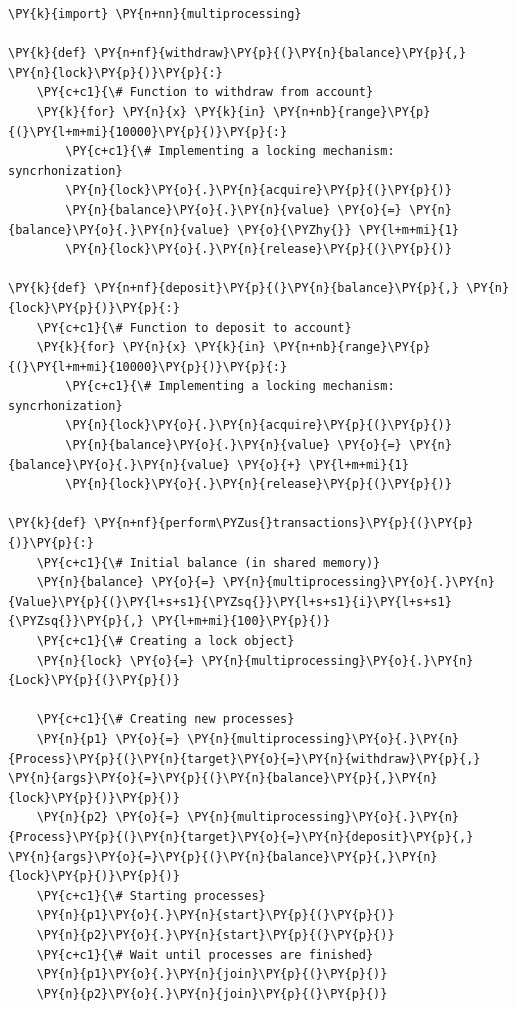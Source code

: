 \begin{Verbatim}[label=\makebox{\url{https://github.com/lucabaldini/cmepda/tree/master/slides/latex/snippets/synchro2.py}},commandchars=\\\{\}]
\PY{k}{import} \PY{n+nn}{multiprocessing}

\PY{k}{def} \PY{n+nf}{withdraw}\PY{p}{(}\PY{n}{balance}\PY{p}{,} \PY{n}{lock}\PY{p}{)}\PY{p}{:}
    \PY{c+c1}{\# Function to withdraw from account}
    \PY{k}{for} \PY{n}{x} \PY{k}{in} \PY{n+nb}{range}\PY{p}{(}\PY{l+m+mi}{10000}\PY{p}{)}\PY{p}{:}
        \PY{c+c1}{\# Implementing a locking mechanism: syncrhonization}
        \PY{n}{lock}\PY{o}{.}\PY{n}{acquire}\PY{p}{(}\PY{p}{)}
        \PY{n}{balance}\PY{o}{.}\PY{n}{value} \PY{o}{=} \PY{n}{balance}\PY{o}{.}\PY{n}{value} \PY{o}{\PYZhy{}} \PY{l+m+mi}{1}
        \PY{n}{lock}\PY{o}{.}\PY{n}{release}\PY{p}{(}\PY{p}{)}

\PY{k}{def} \PY{n+nf}{deposit}\PY{p}{(}\PY{n}{balance}\PY{p}{,} \PY{n}{lock}\PY{p}{)}\PY{p}{:}
    \PY{c+c1}{\# Function to deposit to account}
    \PY{k}{for} \PY{n}{x} \PY{k}{in} \PY{n+nb}{range}\PY{p}{(}\PY{l+m+mi}{10000}\PY{p}{)}\PY{p}{:}
        \PY{c+c1}{\# Implementing a locking mechanism: syncrhonization}
        \PY{n}{lock}\PY{o}{.}\PY{n}{acquire}\PY{p}{(}\PY{p}{)}
        \PY{n}{balance}\PY{o}{.}\PY{n}{value} \PY{o}{=} \PY{n}{balance}\PY{o}{.}\PY{n}{value} \PY{o}{+} \PY{l+m+mi}{1}
        \PY{n}{lock}\PY{o}{.}\PY{n}{release}\PY{p}{(}\PY{p}{)}

\PY{k}{def} \PY{n+nf}{perform\PYZus{}transactions}\PY{p}{(}\PY{p}{)}\PY{p}{:}
    \PY{c+c1}{\# Initial balance (in shared memory)}
    \PY{n}{balance} \PY{o}{=} \PY{n}{multiprocessing}\PY{o}{.}\PY{n}{Value}\PY{p}{(}\PY{l+s+s1}{\PYZsq{}}\PY{l+s+s1}{i}\PY{l+s+s1}{\PYZsq{}}\PY{p}{,} \PY{l+m+mi}{100}\PY{p}{)}
    \PY{c+c1}{\# Creating a lock object}
    \PY{n}{lock} \PY{o}{=} \PY{n}{multiprocessing}\PY{o}{.}\PY{n}{Lock}\PY{p}{(}\PY{p}{)}

    \PY{c+c1}{\# Creating new processes}
    \PY{n}{p1} \PY{o}{=} \PY{n}{multiprocessing}\PY{o}{.}\PY{n}{Process}\PY{p}{(}\PY{n}{target}\PY{o}{=}\PY{n}{withdraw}\PY{p}{,} \PY{n}{args}\PY{o}{=}\PY{p}{(}\PY{n}{balance}\PY{p}{,}\PY{n}{lock}\PY{p}{)}\PY{p}{)}
    \PY{n}{p2} \PY{o}{=} \PY{n}{multiprocessing}\PY{o}{.}\PY{n}{Process}\PY{p}{(}\PY{n}{target}\PY{o}{=}\PY{n}{deposit}\PY{p}{,} \PY{n}{args}\PY{o}{=}\PY{p}{(}\PY{n}{balance}\PY{p}{,}\PY{n}{lock}\PY{p}{)}\PY{p}{)}
    \PY{c+c1}{\# Starting processes}
    \PY{n}{p1}\PY{o}{.}\PY{n}{start}\PY{p}{(}\PY{p}{)}
    \PY{n}{p2}\PY{o}{.}\PY{n}{start}\PY{p}{(}\PY{p}{)}
    \PY{c+c1}{\# Wait until processes are finished}
    \PY{n}{p1}\PY{o}{.}\PY{n}{join}\PY{p}{(}\PY{p}{)}
    \PY{n}{p2}\PY{o}{.}\PY{n}{join}\PY{p}{(}\PY{p}{)}


\end{Verbatim}
